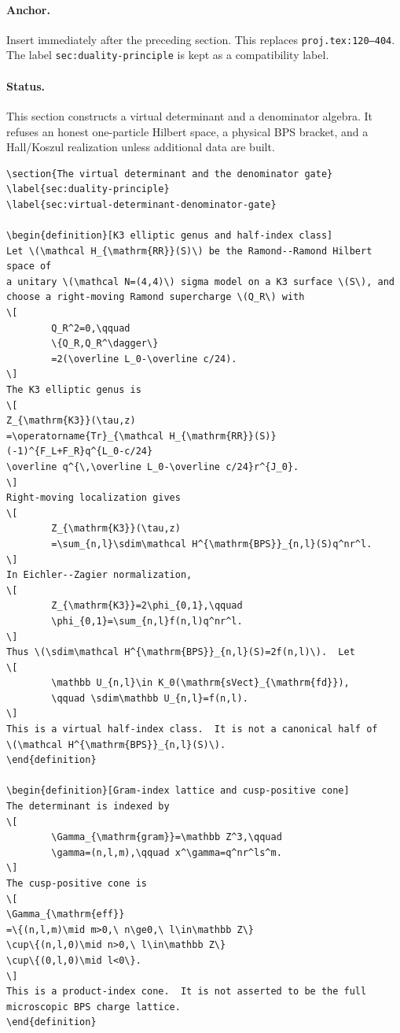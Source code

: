 \paragraph{Anchor.}
Insert immediately after the preceding section.  This replaces
\texttt{proj.tex:120--404}.  The label \texttt{sec:duality-principle} is
kept as a compatibility label.

\paragraph{Status.}
This section constructs a virtual determinant and a denominator algebra.
It refuses an honest one-particle Hilbert space, a physical BPS bracket,
and a Hall/Koszul realization unless additional data are built.

\begin{verbatim}
\section{The virtual determinant and the denominator gate}
\label{sec:duality-principle}
\label{sec:virtual-determinant-denominator-gate}

\begin{definition}[K3 elliptic genus and half-index class]
Let \(\mathcal H_{\mathrm{RR}}(S)\) be the Ramond--Ramond Hilbert space of
a unitary \(\mathcal N=(4,4)\) sigma model on a K3 surface \(S\), and
choose a right-moving Ramond supercharge \(Q_R\) with
\[
        Q_R^2=0,\qquad
        \{Q_R,Q_R^\dagger\}
        =2(\overline L_0-\overline c/24).
\]
The K3 elliptic genus is
\[
Z_{\mathrm{K3}}(\tau,z)
=\operatorname{Tr}_{\mathcal H_{\mathrm{RR}}(S)}
(-1)^{F_L+F_R}q^{L_0-c/24}
\overline q^{\,\overline L_0-\overline c/24}r^{J_0}.
\]
Right-moving localization gives
\[
        Z_{\mathrm{K3}}(\tau,z)
        =\sum_{n,l}\sdim\mathcal H^{\mathrm{BPS}}_{n,l}(S)q^nr^l.
\]
In Eichler--Zagier normalization,
\[
        Z_{\mathrm{K3}}=2\phi_{0,1},\qquad
        \phi_{0,1}=\sum_{n,l}f(n,l)q^nr^l.
\]
Thus \(\sdim\mathcal H^{\mathrm{BPS}}_{n,l}(S)=2f(n,l)\).  Let
\[
        \mathbb U_{n,l}\in K_0(\mathrm{sVect}_{\mathrm{fd}}),
        \qquad \sdim\mathbb U_{n,l}=f(n,l).
\]
This is a virtual half-index class.  It is not a canonical half of
\(\mathcal H^{\mathrm{BPS}}_{n,l}(S)\).
\end{definition}

\begin{definition}[Gram-index lattice and cusp-positive cone]
The determinant is indexed by
\[
        \Gamma_{\mathrm{gram}}=\mathbb Z^3,\qquad
        \gamma=(n,l,m),\qquad x^\gamma=q^nr^ls^m.
\]
The cusp-positive cone is
\[
\Gamma_{\mathrm{eff}}
=\{(n,l,m)\mid m>0,\ n\ge0,\ l\in\mathbb Z\}
\cup\{(n,l,0)\mid n>0,\ l\in\mathbb Z\}
\cup\{(0,l,0)\mid l<0\}.
\]
This is a product-index cone.  It is not asserted to be the full
microscopic BPS charge lattice.
\end{definition}


\end{verbatim}
